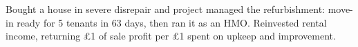 Bought a house in severe disrepair and project managed the refurbishment: move-in ready for 5 tenants in 63 days, then ran it as an HMO. Reinvested rental income, returning \pounds{}1 of sale profit per \pounds{}1 spent on upkeep and improvement.
\sectionsep{}
